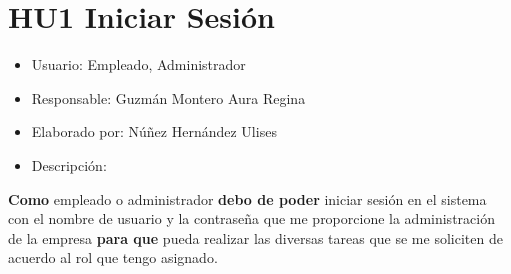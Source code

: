 \section{HU1 Iniciar Sesión}
	\begin{itemize}
	\item Usuario: Empleado, Administrador
	\item Responsable: Guzmán Montero Aura Regina
	\item Elaborado por: Núñez Hernández Ulises
	\item Descripción:\\
\end{itemize}

\textbf{Como} empleado o administrador \textbf{debo de poder} iniciar sesión en el sistema con el nombre de usuario y la contraseña que me proporcione la administración de la empresa \textbf{para que} pueda realizar las diversas tareas que se me soliciten de acuerdo al rol que tengo asignado. 